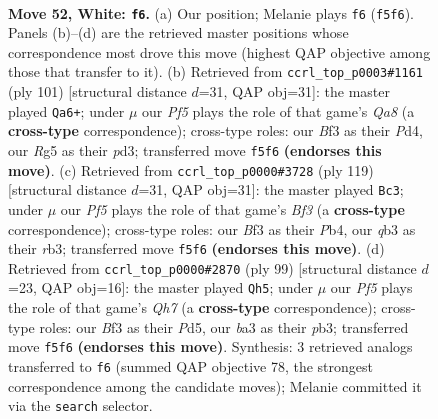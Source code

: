 \documentclass[11pt]{article}
\begin{document}
\clearpage

\begin{figure}[p]\centering
\begin{subfigure}{0.46\textwidth}\centering
\resizebox{\linewidth}{!}{%
\newchessgame
\chessboard[
  setfen={8/p7/8/1p3PR1/3k4/bq3BK1/8/8 w - - 6 52},
  showmover=false,
  pgfstyle=straightmove, color=movearrow, markmove={f5-f6}
]}
\caption{}
\end{subfigure}\hfill
\begin{subfigure}{0.46\textwidth}\centering
\resizebox{\linewidth}{!}{%
\newchessgame
\chessboard[
  setfen={8/8/6K1/4Q3/3p4/1k1P1PP1/8/q7 b - - 0 51},
  showmover=false,
  pgfstyle=straightmove, color=movearrow, markmove={a1-a6}
]}
\caption{}
\end{subfigure}
\\[4pt]
\begin{subfigure}{0.46\textwidth}\centering
\resizebox{\linewidth}{!}{%
\newchessgame
\chessboard[
  setfen={8/1r5k/5b2/8/1p2P3/1R2B3/8/7K b - - 0 60},
  showmover=false,
  pgfstyle=straightmove, color=movearrow, markmove={f6-c3}
]}
\caption{}
\end{subfigure}\hfill
\begin{subfigure}{0.46\textwidth}\centering
\resizebox{\linewidth}{!}{%
\newchessgame
\chessboard[
  setfen={8/1Q6/4kr2/P2p4/8/1P2B3/7q/1K6 b - - 6 50},
  showmover=false,
  pgfstyle=straightmove, color=movearrow, markmove={h2-h5}
]}
\caption{}
\end{subfigure}
\caption{\textbf{Move 52, White: \texttt{f6}.} (a) Our position; Melanie plays \texttt{f6} (\texttt{f5f6}). Panels (b)--(d) are the retrieved master positions whose correspondence most drove this move (highest QAP objective among those that transfer to it). (b) Retrieved from \texttt{ccrl\_top\_p0003\#1161} (ply 101) [structural distance $d$=31, QAP obj=31]: the master played \texttt{Qa6+}; under $\mu$ our \emph{Pf5} plays the role of that game's \emph{Qa8} (a \textbf{cross-type} correspondence); cross-type roles: our \emph{B}f3 as their \emph{P}d4, our \emph{R}g5 as their \emph{p}d3; transferred move \texttt{f5f6} \textbf{(endorses this move)}. (c) Retrieved from \texttt{ccrl\_top\_p0000\#3728} (ply 119) [structural distance $d$=31, QAP obj=31]: the master played \texttt{Bc3}; under $\mu$ our \emph{Pf5} plays the role of that game's \emph{Bf3} (a \textbf{cross-type} correspondence); cross-type roles: our \emph{B}f3 as their \emph{P}b4, our \emph{q}b3 as their \emph{r}b3; transferred move \texttt{f5f6} \textbf{(endorses this move)}. (d) Retrieved from \texttt{ccrl\_top\_p0000\#2870} (ply 99) [structural distance $d$=23, QAP obj=16]: the master played \texttt{Qh5}; under $\mu$ our \emph{Pf5} plays the role of that game's \emph{Qh7} (a \textbf{cross-type} correspondence); cross-type roles: our \emph{B}f3 as their \emph{P}d5, our \emph{b}a3 as their \emph{p}b3; transferred move \texttt{f5f6} \textbf{(endorses this move)}. Synthesis: 3 retrieved analogs transferred to \texttt{f6} (summed QAP objective 78, the strongest correspondence among the candidate moves); Melanie committed it via the \texttt{search} selector.}
\label{fig:thought-m102}
\end{figure}
\end{document}
